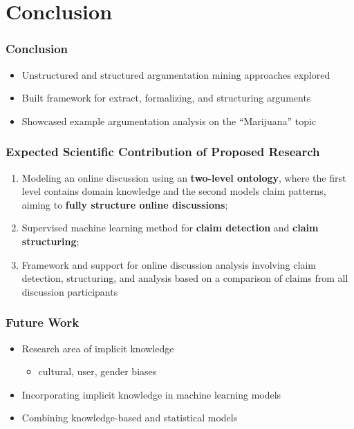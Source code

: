 \documentclass{beamer}
\begin{document}
\section{Conclusion}

\begin{frame}
\frametitle{Conclusion}
	\begin{itemize}
	\item Unstructured and structured argumentation mining approaches explored
	\item Built framework for extract, formalizing, and structuring arguments
	\item Showcased example argumentation analysis on the ``Marijuana'' topic
	\end{itemize}
\end{frame}




\begin{frame}
	\frametitle{Expected Scientific Contribution of Proposed Research}
\begin{enumerate}
\item Modeling an online discussion using an \textbf{two-level ontology}, where the
	first level contains domain knowledge and the second models claim
	patterns, aiming to \textbf{fully structure online discussions};
\item Supervised machine learning method for \textbf{claim detection} and \textbf{claim
	structuring};
\item Framework and support for online discussion analysis involving claim
	detection, structuring, and analysis based on a comparison of claims
	from all discussion participants
\end{enumerate}

\end{frame}

\begin{frame}
	\frametitle{Future Work}
	\begin{itemize}
		\item Research area of implicit knowledge
		\begin{itemize}
			\vspace{0.25cm}
			\item cultural, user, gender biases

		\end{itemize}
			\vspace{0.5cm}
		\item Incorporating implicit knowledge in machine learning models
			\vspace{0.5cm}
		\item Combining knowledge-based and statistical models
	\end{itemize}
\end{frame}
\end{document}
